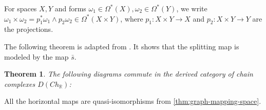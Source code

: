 \documentclass{scrartcl}
\theoremstyle{plain}
\newtheorem{theorem}{Theorem}[section]
\theoremstyle{definition}
\newcommand{\R}{\mathbb R}
\DeclareMathOperator{\Map}{Map}
\begin{document}
For spaces $X, Y$ and forms $\omega_1\in\Omega^*(X), \omega_2\in\Omega^*(Y)$, we write $\omega_1\times\omega_2 = p_1^*\omega_1 \wedge p_2\omega_2\in\Omega^*(X\times Y)$, where $p_1\colon X\times Y\to X$ and $p_2\colon X\times Y\to Y$ are the projections.

The following theorem is adapted from \cite[Prop. 4.2]{naef2019string}. It shows that the splitting map is modeled by the map $\bar s$. 
\begin{theorem}\label{thm:model-splitting}
    The following diagrams commute in the derived category of chain complexes $D(Ch_\R)$:

    \qquad
\end{theorem}
All the horizontal maps are quasi-isomorphisms from \cref{thm:graph-mapping-space}.
\end{document}

